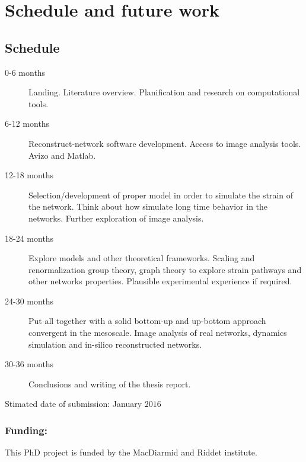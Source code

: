 
\chapter{Schedule and future work} %

\label{Chapter-future} %



\section{Schedule}

\begin{description}
  \item[0-6 months] Landing. Literature overview. Planification and research on
  computational tools.
  \item[6-12 months] Reconstruct-network software development.
   Access to image analysis tools. Avizo and Matlab.
  \item[12-18 months] Selection/development of proper model in order to simulate
  the strain of the network. Think about how simulate long time behavior in the
  networks. Further exploration of image analysis.
  \item[18-24 months] Explore models and other theoretical frameworks.
  Scaling and renormalization group theory, graph theory to explore strain
  pathways and other networks properties. Plausible experimental experience if
  required.
  \item[24-30 months] Put all together with a solid bottom-up and up-bottom
   approach convergent in the mesoscale. Image analysis of real networks,
   dynamics simulation and in-silico reconstructed networks.
   \item[30-36 months] Conclusions and writing of the
   thesis report.
   
\end{description}
Stimated date of submission: January $2016$
\subsection{Funding:}
This PhD project is funded by the MacDiarmid and Riddet
institute. 

